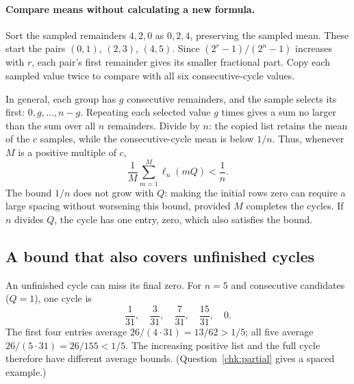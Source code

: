 \documentclass[10pt]{article}
\theoremstyle{plain}
\theoremstyle{definition}
\theoremstyle{remark}
\newcommand{\lft}{\ell}
\begin{document}
\paragraph{Compare means without calculating a new formula.}
Sort the sampled remainders $4,2,0$ as $0,2,4$, preserving the sampled mean.
These start the pairs $(0,1)$, $(2,3)$, $(4,5)$. Since
\mbox{$(2^r-1)/(2^n-1)$} increases with $r$, each pair's first remainder gives
its smaller fractional part. Copy each sampled value twice to compare
with all six consecutive-cycle values.
\begin{center}
\captionsetup{hypcap=false}

\label{fig:cycle-mean}
\end{center}
\begin{samepage}
In general, each group has $g$ consecutive remainders, and the sample
selects its first: $0,g,\dots,n-g$. Repeating each selected value $g$ times
gives a sum no larger than the sum over all $n$ remainders. Divide by $n$:
the copied list retains the mean of the $c$ samples, while the consecutive-cycle
mean is below $1/n$. Thus, whenever $M$ is a positive multiple of $c$,
\begin{equation}\label{eq:cycle-main}
 \frac1M\sum_{m=1}^{M}\lft_n(mQ)<\frac1n.
\end{equation}
The bound $1/n$ does not grow with $Q$: making the initial rows zero can
require a large spacing without worsening this bound, provided $M$ completes
the cycles. If $n$ divides $Q$, the cycle has one entry, zero, which also
satisfies the bound.\par
\end{samepage}

\pagebreak[0]
\begin{samepage}
\subsection{A bound that also covers unfinished cycles}\label{sec:unfinished}

An unfinished cycle can miss its final zero. For $n=5$ and consecutive
candidates ($Q=1$), one cycle is
\[
 \frac1{31},\quad\frac3{31},\quad\frac7{31},\quad\frac{15}{31},\quad0.
\]
The first four entries average $26/(4\cdot31)=13/62>1/5$;
all five average $26/(5\cdot31)=26/155<1/5$.
The increasing positive list and the full cycle therefore have different
average bounds. (Question~\ref{chk:partial} gives a spaced example.)\par
\end{samepage}
\end{document}
